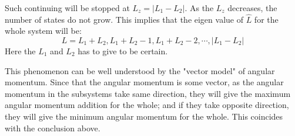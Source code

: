 Such continuing will be stopped at $L_{z} = |L_{1} - L_{2}|$. As the
$L_{z}$ decreases, the number of states do not grow. This implies
that the eigen value of $\hat{L}$ for the whole system will be:
\begin{equation}\label{}
L = L_{1}+L_{2}, L_{1}+L_{2}-1, L_{1}+L_{2}-2, \cdots, |L_{1} -
L_{2}|
\end{equation}
Here the $L_{1}$ and $L_{2}$ has to give to be certain.

This phenomenon can be well understood by the "vector model" of
angular momentum. Since that the angular momentum is some vector, as
the angular momentum in the subsystems take same direction, they
will give the maximum angular momentum addition for the whole; and
if they take opposite direction, they will give the minimum angular
momentum for the whole. This coincides with the conclusion above.



